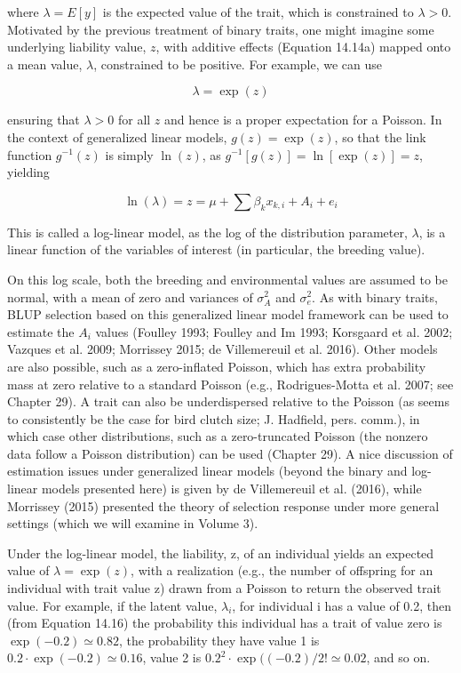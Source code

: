 \documentclass{article}
\begin{document}
where  $ \lambda = E[y] $ is the expected value of the trait, which is constrained to  $ \lambda > 0 $. Motivated by the previous treatment of binary traits, one might imagine some underlying liability value,  $ z $, with additive effects (Equation 14.14a) mapped onto a mean value,  $ \lambda $, constrained to be positive. For example, we can use

\begin{equation}
\lambda=\exp(z)
\tag{14.17a}
\label{eq:14_17a}
\end{equation}

ensuring that $\lambda > 0$ for all $z$ and hence is a proper expectation for a Poisson. In the context of generalized linear models, $g(z) = \exp(z)$, so that the link function $g^{-1}(z)$ is simply $\ln(z)$, as $g^{-1}[g(z)] = \ln[\exp(z)] = z$, yielding

\begin{equation}
\ln(\lambda)=z=\mu+\sum\beta_{k}x_{k,i}+A_{i}+e_{i}
\tag{14.17b}
\label{eq:14_17b}
\end{equation}

This is called a log-linear model, as the log of the distribution parameter,  $ \lambda $, is a linear function of the variables of interest (in particular, the breeding value).

On this log scale, both the breeding and environmental values are assumed to be normal, with a mean of zero and variances of  $ \sigma_{A}^{2} $ and  $ \sigma_{e}^{2} $. As with binary traits, BLUP selection based on this generalized linear model framework can be used to estimate the  $ A_{i} $ values (Foulley 1993; Foulley and Im 1993; Korsgaard et al. 2002; Vazques et al. 2009; Morrissey 2015; de Villemereuil et al. 2016). Other models are also possible, such as a zero-inflated Poisson, which has extra probability mass at zero relative to a standard Poisson (e.g., Rodrigues-Motta et al. 2007; see Chapter 29). A trait can also be underdispersed relative to the Poisson (as seems to consistently be the case for bird clutch size; J. Hadfield, pers. comm.), in which case other distributions, such as a zero-truncated Poisson (the nonzero data follow a Poisson distribution) can be used (Chapter 29). A nice discussion of estimation issues under generalized linear models (beyond the binary and log-linear models presented here) is given by de Villemereuil et al. (2016), while Morrissey (2015) presented the theory of selection response under more general settings (which we will examine in Volume 3).

Under the log-linear model, the liability, z, of an individual yields an expected value of  $ \lambda = \exp(z) $, with a realization (e.g., the number of offspring for an individual with trait value z) drawn from a Poisson to return the observed trait value. For example, if the latent value,  $ \lambda_i $, for individual i has a value of 0.2, then (from Equation 14.16) the probability this individual has a trait of value zero is  $ \exp(-0.2) \simeq 0.82 $, the probability they have value 1 is  $ 0.2 \cdot \exp(-0.2) \simeq 0.16 $, value 2 is  $ 0.2^2 \cdot \exp((-0.2)/2! \simeq 0.02 $, and so on.
\end{document}
